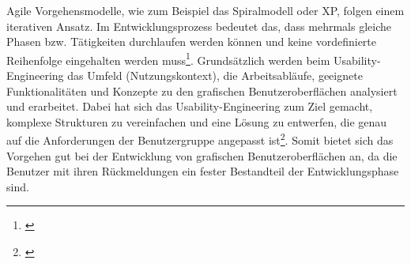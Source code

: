Agile Vorgehensmodelle, wie zum Beispiel das Spiralmodell oder \gls{XP}, folgen einem iterativen Ansatz. Im Entwicklungsprozess bedeutet das, dass mehrmals gleiche Phasen bzw. Tätigkeiten durchlaufen werden können und keine vordefinierte Reihenfolge eingehalten werden muss\footnote{\cite[vgl.][29\psqq]{Brandt2008}}. Grundsätzlich werden beim Usability-Engineering das Umfeld (Nutzungskontext), die Arbeitsabläufe, geeignete Funktionalitäten und Konzepte zu den grafischen Benutzeroberflächen analysiert und erarbeitet. Dabei hat sich das Usability-Engineering zum Ziel gemacht, komplexe Strukturen zu vereinfachen und eine Lösung zu entwerfen, die genau auf die Anforderungen der Benutzergruppe angepasst ist\footnote{\cite[vgl.][7]{Richter2013}}. Somit bietet sich das Vorgehen gut bei der Entwicklung von grafischen Benutzeroberflächen an, da die Benutzer mit ihren Rückmeldungen ein fester Bestandteil der Entwicklungsphase sind.

